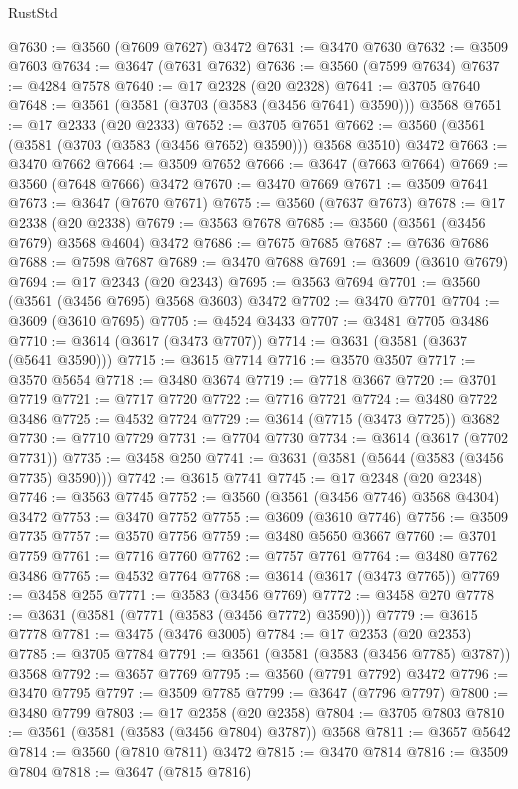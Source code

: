 \begin{lexlean}{RustStd}
\begin{coremodule}
@7630 := @3560 (@7609 @7627) @3472
@7631 := @3470 @7630
@7632 := @3509 @7603
@7634 := @3647 (@7631 @7632)
@7636 := @3560 (@7599 @7634)
@7637 := @4284 @7578
@7640 := @17 @2328 (@20 @2328)
@7641 := @3705 @7640
@7648 := @3561 (@3581 (@3703 (@3583 (@3456 @7641) @3590))) @3568
@7651 := @17 @2333 (@20 @2333)
@7652 := @3705 @7651
@7662 := @3560 (@3561 (@3581 (@3703 (@3583 (@3456 @7652) @3590))) @3568 @3510) @3472
@7663 := @3470 @7662
@7664 := @3509 @7652
@7666 := @3647 (@7663 @7664)
@7669 := @3560 (@7648 @7666) @3472
@7670 := @3470 @7669
@7671 := @3509 @7641
@7673 := @3647 (@7670 @7671)
@7675 := @3560 (@7637 @7673)
@7678 := @17 @2338 (@20 @2338)
@7679 := @3563 @7678
@7685 := @3560 (@3561 (@3456 @7679) @3568 @4604) @3472
@7686 := @7675 @7685
@7687 := @7636 @7686
@7688 := @7598 @7687
@7689 := @3470 @7688
@7691 := @3609 (@3610 @7679)
@7694 := @17 @2343 (@20 @2343)
@7695 := @3563 @7694
@7701 := @3560 (@3561 (@3456 @7695) @3568 @3603) @3472
@7702 := @3470 @7701
@7704 := @3609 (@3610 @7695)
@7705 := @4524 @3433
@7707 := @3481 @7705 @3486
@7710 := @3614 (@3617 (@3473 @7707))
@7714 := @3631 (@3581 (@3637 (@5641 @3590)))
@7715 := @3615 @7714
@7716 := @3570 @3507
@7717 := @3570 @5654
@7718 := @3480 @3674
@7719 := @7718 @3667
@7720 := @3701 @7719
@7721 := @7717 @7720
@7722 := @7716 @7721
@7724 := @3480 @7722 @3486
@7725 := @4532 @7724
@7729 := @3614 (@7715 (@3473 @7725)) @3682
@7730 := @7710 @7729
@7731 := @7704 @7730
@7734 := @3614 (@3617 (@7702 @7731))
@7735 := @3458 @250
@7741 := @3631 (@3581 (@5644 (@3583 (@3456 @7735) @3590)))
@7742 := @3615 @7741
@7745 := @17 @2348 (@20 @2348)
@7746 := @3563 @7745
@7752 := @3560 (@3561 (@3456 @7746) @3568 @4304) @3472
@7753 := @3470 @7752
@7755 := @3609 (@3610 @7746)
@7756 := @3509 @7735
@7757 := @3570 @7756
@7759 := @3480 @5650 @3667
@7760 := @3701 @7759
@7761 := @7716 @7760
@7762 := @7757 @7761
@7764 := @3480 @7762 @3486
@7765 := @4532 @7764
@7768 := @3614 (@3617 (@3473 @7765))
@7769 := @3458 @255
@7771 := @3583 (@3456 @7769)
@7772 := @3458 @270
@7778 := @3631 (@3581 (@7771 (@3583 (@3456 @7772) @3590)))
@7779 := @3615 @7778
@7781 := @3475 (@3476 @3005)
@7784 := @17 @2353 (@20 @2353)
@7785 := @3705 @7784
@7791 := @3561 (@3581 (@3583 (@3456 @7785) @3787)) @3568
@7792 := @3657 @7769
@7795 := @3560 (@7791 @7792) @3472
@7796 := @3470 @7795
@7797 := @3509 @7785
@7799 := @3647 (@7796 @7797)
@7800 := @3480 @7799
@7803 := @17 @2358 (@20 @2358)
@7804 := @3705 @7803
@7810 := @3561 (@3581 (@3583 (@3456 @7804) @3787)) @3568
@7811 := @3657 @5642
@7814 := @3560 (@7810 @7811) @3472
@7815 := @3470 @7814
@7816 := @3509 @7804
@7818 := @3647 (@7815 @7816)

\end{coremodule}
\end{lexlean}

